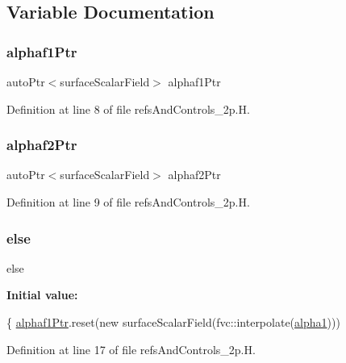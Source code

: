 \subsection{Variable Documentation}
\mbox{\label{refsAndControls__2p_8H_af3c259085af2100505920007f2efd8d5}} 
\subsubsection{\texorpdfstring{alphaf1\+Ptr}{alphaf1Ptr}}
{\footnotesize\ttfamily auto\+Ptr$<$surface\+Scalar\+Field$>$ alphaf1\+Ptr}



Definition at line 8 of file refs\+And\+Controls\+\_\+2p.\+H.

\mbox{\label{refsAndControls__2p_8H_ac8b93dc9a33a53440d41ca437c0a03c9}} 
\subsubsection{\texorpdfstring{alphaf2\+Ptr}{alphaf2Ptr}}
{\footnotesize\ttfamily auto\+Ptr$<$surface\+Scalar\+Field$>$ alphaf2\+Ptr}



Definition at line 9 of file refs\+And\+Controls\+\_\+2p.\+H.

\mbox{\label{refsAndControls__2p_8H_a0544c3fe466e421738dae463968b70ba}} 
\subsubsection{\texorpdfstring{else}{else}}
{\footnotesize\ttfamily else}

{\bfseries Initial value\+:}
\begin{DoxyCode}
\{
    \hyperlink{refsAndControls__2p_8H_af3c259085af2100505920007f2efd8d5}{alphaf1Ptr}.reset(\textcolor{keyword}{new} surfaceScalarField(fvc::interpolate(\hyperlink{alphaEqns__2p_8H_a9cf7e208292359f8f667534601eac83c}{alpha1})))
\end{DoxyCode}


Definition at line 17 of file refs\+And\+Controls\+\_\+2p.\+H.

